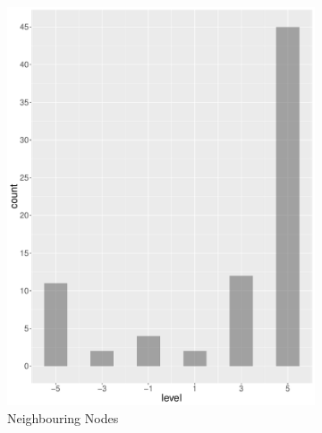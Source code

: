 \begin{figure}
    \centering
    \begin{subfigure}[b]{0.4\textwidth}
        \includegraphics[width=\textwidth]{plots/finance/hist_level_nn}
        \caption{Neighbouring Nodes}
        \label{fig:hist_level_finance_nn}
    \end{subfigure}
    ~
    \begin{subfigure}[b]{0.4\textwidth}

\end{subfigure}
\end{figure}
